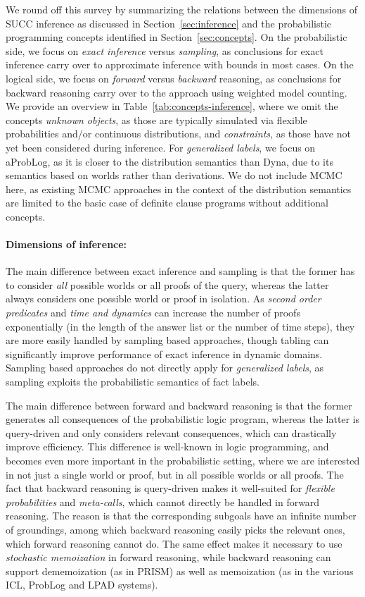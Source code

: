 \documentclass[a4paper]{article}
\begin{document}
We round off this survey by summarizing the relations between the
dimensions of SUCC inference as discussed in Section~\ref{sec:inference} and
the probabilistic programming concepts identified in
Section~\ref{sec:concepts}. On the probabilistic side, we focus on \emph{exact inference} versus
\emph{sampling}, as conclusions for exact inference carry over to
approximate inference with bounds in most cases. On the logical side,
we focus on \emph{forward} 
versus  \emph{backward} reasoning, as conclusions for backward
reasoning carry over to the approach using weighted model counting. 
We provide an overview
in Table~\ref{tab:concepts-inference}, where we omit the concepts
\emph{unknown objects}, as those are typically simulated via flexible probabilities and/or continuous
  distributions, and \emph{constraints}, as those have not yet been considered
  during inference. For \emph{generalized labels}, we focus on
  aProbLog, as it is closer to the distribution semantics than Dyna,
  due to its semantics based on worlds rather than derivations. We do not include MCMC here, as existing MCMC
  approaches in the context of the distribution semantics are limited
  to the basic case of definite clause programs without additional
  concepts. 

\paragraph{Dimensions of inference:} The main difference between exact inference and sampling is that the
former has to consider \emph{all} possible worlds or all proofs of the
query, whereas the latter always considers one possible world or proof
in isolation. As \emph{second order predicates} and \emph{time and dynamics} can
increase the number of proofs exponentially (in the length of the
answer list or the number of time steps), they are more easily handled
by sampling based approaches, though tabling can significantly improve
performance of exact inference in dynamic domains. Sampling based
approaches do not directly apply for \emph{generalized labels}, as sampling
exploits the  probabilistic semantics of fact labels.

The main difference between forward and backward reasoning is that the
former generates all consequences of the probabilistic logic program,
whereas the latter is query-driven and only considers relevant
consequences, which can drastically improve efficiency. This difference is well-known in logic programming, and
becomes even more important in the probabilistic setting, where we are
interested in not just a single world or proof, but in all possible
worlds or all proofs. The fact that backward reasoning is query-driven
makes it well-suited for \emph{flexible probabilities} and
\emph{meta-calls}, which cannot directly be handled in forward reasoning. The
reason is that the corresponding subgoals have an infinite number of
groundings, among which backward reasoning easily picks the relevant
ones, which forward reasoning cannot do. The same effect makes it
necessary to use \emph{stochastic memoization} in forward reasoning, while backward
reasoning can support dememoization (as in PRISM) as well as
memoization (as in the various ICL, ProbLog and LPAD systems). 
\end{document}

